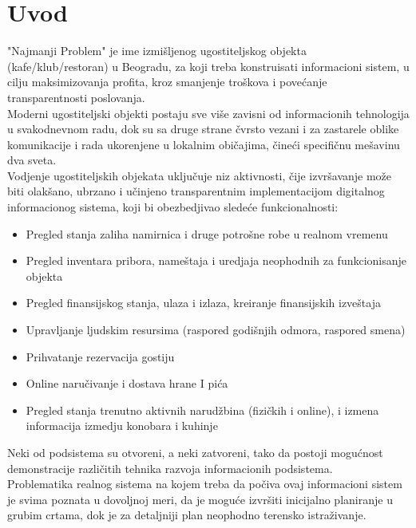 \documentclass{article}
\begin{document}

\section{Uvod}
"Najmanji Problem" je ime izmišljenog ugostiteljskog objekta (kafe/klub/restoran) u Beogradu, za koji treba
konstruisati informacioni sistem, u cilju maksimizovanja profita, kroz smanjenje troškova i povećanje transparentnosti
poslovanja.\\

Moderni ugostiteljski objekti postaju sve više zavisni od informacionih tehnologija u svakodnevnom radu, dok su sa
druge strane čvrsto vezani i za zastarele oblike komunikacije i rada ukorenjene u lokalnim običajima, čineći specifičnu
mešavinu dva sveta.\\

Vodjenje ugostiteljskih objekata uključuje niz aktivnosti, čije izvršavanje može biti olakšano, ubrzano i učinjeno
transparentnim implementacijom digitalnog informacionog sistema, koji bi obezbedjivao sledeće funkcionalnosti:\\

\begin{itemize}
\item Pregled stanja zaliha namirnica i druge potrošne robe u realnom vremenu
\item Pregled inventara pribora, nameštaja i uredjaja neophodnih za funkcionisanje objekta
\item Pregled finansijskog stanja, ulaza i izlaza, kreiranje finansijskih izveštaja
\item Upravljanje ljudskim resursima (raspored godišnjih odmora, raspored smena)
\item Prihvatanje rezervacija gostiju
\item Online naručivanje i dostava hrane I pića
\item Pregled stanja trenutno aktivnih narudžbina (fizičkih i online), i izmena informacija izmedju konobara i kuhinje
\end{itemize}

Neki od podsistema su otvoreni, a neki zatvoreni, tako da postoji mogućnost demonstracije različitih tehnika razvoja
informacionih podsistema.\\

Problematika realnog sistema na kojem treba da počiva ovaj informacioni sistem je svima poznata u dovoljnoj meri,
da je moguće izvršiti inicijalno planiranje u grubim crtama, dok je za detaljniji plan neophodno terensko istraživanje.\\
\end{document}

